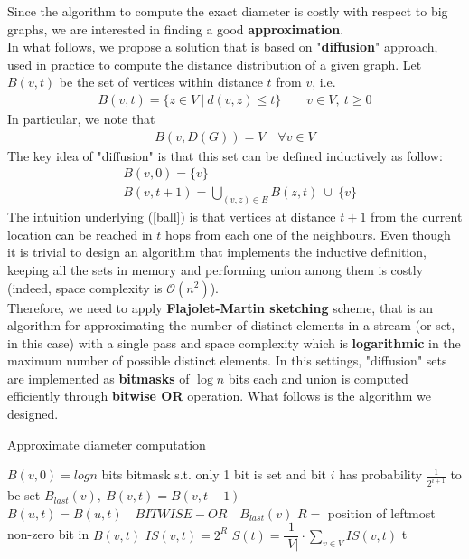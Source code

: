 Since the algorithm to compute the exact diameter is costly with respect to big graphs, we are interested in finding a good \textbf{approximation}.\\
In what follows, we propose a solution that is based on "\textbf{diffusion}" approach, used in practice to compute the distance distribution of a given graph. Let $B(v,t)$ be the set of vertices within distance $t$ from $v$, i.e.
\begin{align*}
B(v,t) = \{ z \in V \ | \ d(v,z) \le t \} \qquad v \in V, \ t \ge 0
\end{align*}
In particular, we note that
\begin{align}
B(v,D(G)) = V \quad \forall v \in V \label{ball_diameter}
\end{align}
The key idea of "diffusion" is that this set can be defined inductively as follow:
\begin{align}
&B(v,0) = \{ v \} \nonumber\\
&B(v,t+1) = \bigcup_{(v,z) \in E} B(z,t) \ \cup \ \{ v \} \label{ball}
\end{align}
The intuition underlying (\ref{ball}) is that vertices at distance $t+1$ from the current location can be reached in $t$ hops from each one of the neighbours. Even though it is trivial to design an algorithm that implements the inductive definition, keeping all the sets in memory and performing union among them is costly (indeed, space complexity is $\mathcal{O}(n^2)$).\\
Therefore, we need to apply \textbf{Flajolet-Martin sketching}\cite{fm} scheme, that is an algorithm for approximating the number of distinct elements in a stream (or set, in this case) with a single pass and space complexity which is \textbf{logarithmic} in the maximum number of possible distinct elements. In this settings, "diffusion" sets are implemented as \textbf{bitmasks} of $\log{n}$ bits each and union is computed efficiently through \textbf{bitwise OR} operation. What follows is the algorithm we designed.
\medskip
\begin{algorithm}
\caption{Approximate diameter computation}
\begin{algorithmic}[1]
		\State $B(v,0) = log{n}$ bits bitmask s.t. only 1 bit is set and bit $i$ has probability \State $\frac{1}{2^{i+1}}$ to be set
	\EndFor
			\State $B_{last}(v), \ B(v,t) = B(v,t-1)$
		\EndFor
			\State $B(u,t) = B(u,t) \quad BITWISE-OR \quad B_{last}(v)$
		\EndFor
			\State $R =$ position of leftmost non-zero bit in $B(v,t)$
			\State $IS(v,t) = 2^R$
		\EndFor
		\State $S(t) = \dfrac{1}{|V|} \cdot \sum_{v \in V}IS(v,t)$
			\State \Return t 
		\EndIf
	\EndFor
\end{algorithmic}
\end{algorithm}

